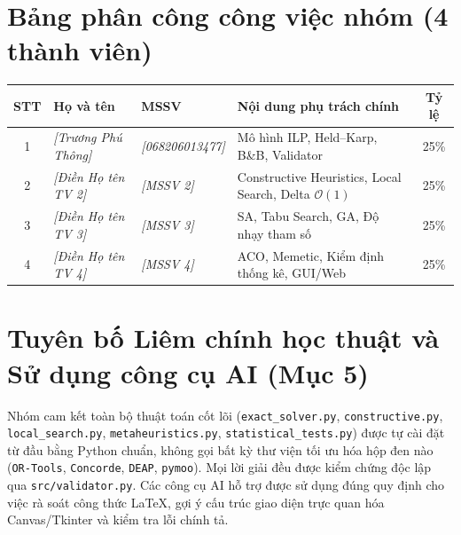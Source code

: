 \documentclass[12pt,a4paper]{report}
\begin{document}
\section{Bảng phân công công việc nhóm (4 thành viên)}
\begin{center}
\begin{tabular}{clllc}
\toprule
\textbf{STT} & \textbf{Họ và tên} & \textbf{MSSV} & \textbf{Nội dung phụ trách chính} & \textbf{Tỷ lệ} \\
\midrule
1 & \textit{[Trương Phú Thông]} & \textit{[068206013477]} & Mô hình ILP, Held--Karp, B\&B, Validator & 25\% \\
2 & \textit{[Điền Họ tên TV 2]} & \textit{[MSSV 2]} & Constructive Heuristics, Local Search, Delta $\mathcal{O}(1)$ & 25\% \\
3 & \textit{[Điền Họ tên TV 3]} & \textit{[MSSV 3]} & SA, Tabu Search, GA, Độ nhạy tham số & 25\% \\
4 & \textit{[Điền Họ tên TV 4]} & \textit{[MSSV 4]} & ACO, Memetic, Kiểm định thống kê, GUI/Web & 25\% \\
\bottomrule
\end{tabular}
\end{center}

\section{Tuyên bố Liêm chính học thuật và Sử dụng công cụ AI (Mục 5)}
Nhóm cam kết toàn bộ thuật toán cốt lõi (\texttt{exact\_solver.py}, \texttt{constructive.py}, \texttt{local\_search.py}, \texttt{metaheuristics.py}, \texttt{statistical\_tests.py}) được tự cài đặt từ đầu bằng Python chuẩn, không gọi bất kỳ thư viện tối ưu hóa hộp đen nào (\texttt{OR-Tools}, \texttt{Concorde}, \texttt{DEAP}, \texttt{pymoo}). Mọi lời giải đều được kiểm chứng độc lập qua \texttt{src/validator.py}. Các công cụ AI hỗ trợ được sử dụng đúng quy định cho việc rà soát công thức LaTeX, gợi ý cấu trúc giao diện trực quan hóa Canvas/Tkinter và kiểm tra lỗi chính tả.
\end{document}
